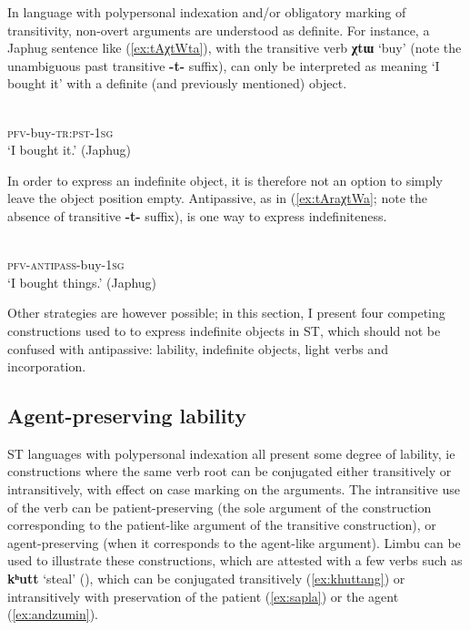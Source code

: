 \documentclass[oneside,a4paper,11pt]{article}
\newcommand{\ipa}[1]{{\phon\textbf{#1}}}
\begin{document}
In language with polypersonal indexation and/or obligatory marking of transitivity, non-overt arguments are understood as definite. For instance, a Japhug sentence like (\ref{ex:tAχtWta}), with the transitive verb \ipa{χtɯ} `buy' (note the unambiguous past transitive \ipa{-t-} suffix), can only be interpreted as meaning `I bought it' with a definite (and previously mentioned) object.

\begin{exe}
\ex \label{ex:tAχtWta}
\gll \ipa{tɤ-χtɯ-t-a} \\
\textsc{pfv}-buy-\textsc{tr:pst-1sg} \\
\glt `I bought it.' (Japhug)
\end{exe}

In order to express an indefinite object, it is therefore not an option to simply leave the object position empty. Antipassive, as in (\ref{ex:tAraχtWa}; note the absence of transitive \ipa{-t-} suffix), is one way to express indefiniteness. 

\begin{exe}
\ex \label{ex:tAraχtWa}
\gll \ipa{tɤ-ra-χtɯ-a} \\
\textsc{pfv}-\textsc{antipass}-buy-\textsc{1sg} \\
\glt `I bought things.' (Japhug)
\end{exe}

Other strategies are however possible; in this section, I present four competing constructions used to to express indefinite objects in ST, which should not be confused with antipassive: lability, indefinite objects, light verbs and incorporation.  

\subsection{Agent-preserving lability} \label{sec:labile}
ST languages with polypersonal indexation all present some degree of lability, ie constructions where the same verb root can be conjugated either transitively or intransitively, with effect on case marking on the arguments. The intransitive use of the verb can be patient-preserving (the sole argument of the construction corresponding to the patient-like argument of the transitive construction), or agent-preserving (when it corresponds to the agent-like argument).  Limbu can be used to illustrate these constructions, which are attested with a few verbs such as  \ipa{kʰutt} `steal' (\citealt[527]{driem91tangut}), which can be conjugated transitively (\ref{ex:khuttang}) or intransitively with preservation of the patient (\ref{ex:sapla}) or the agent (\ref{ex:andzumin}).
\end{document}
